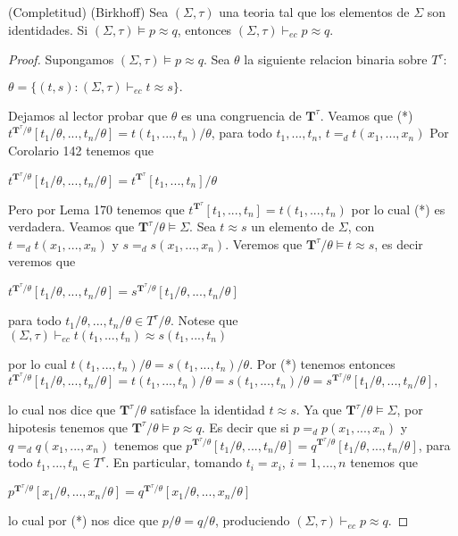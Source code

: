   \begin{theorem}
    (Completitud) (Birkhoff) Sea \((\Sigma ,\tau )\) una teoria tal que los elementos de \(\Sigma \) son identidades. Si \((\Sigma ,\tau )\models p\approx q \), entonces \((\Sigma ,\tau )\vdash _{ec}p\approx q.\)
  \end{theorem}
  \begin{proof}
    Supongamos \((\Sigma ,\tau )\models p\approx q.\) Sea \(\theta \) la siguiente relacion binaria sobre \(T^{\tau }\):

    \(\displaystyle \theta =\{(t,s):(\Sigma ,\tau )\vdash _{ec}t\approx s\}. \)

    Dejamos al lector probar que \(\theta \) es una congruencia de \(\mathbf{T} ^{\tau }\). Veamos que
    (*) \(t^{\mathbf{T}^{\tau }/\theta }[t_{1}/\theta ,...,t_{n}/\theta ]=t(t_{1},...,t_{n})/\theta \), para todo \(t_{1},...,t_{n}\), \( t=_{d}t(x_{1},...,x_{n})\)
    Por Corolario 142 tenemos que

    \(\displaystyle t^{\mathbf{T}^{\tau }/\theta }[t_{1}/\theta ,...,t_{n}/\theta ]=t^{\mathbf{T} ^{\tau }}[t_{1},...,t_{n}]/\theta \)

    Pero por Lema 170 tenemos que \(t^{\mathbf{T}^{\tau }}[t_{1},...,t_{n}]=t(t_{1},...,t_{n})\) por lo cual (*) es verdadera.
    Veamos que \(\mathbf{T}^{\tau }/\theta \models \Sigma .\) Sea \(t\approx s\) un elemento de \(\Sigma \), con \(t=_{d}t(x_{1},...,x_{n})\) y \( s=_{d}s(x_{1},...,x_{n}).\) Veremos que \(\mathbf{T}^{\tau }/\theta \models t\approx s\), es decir veremos que

    \(\displaystyle t^{\mathbf{T}^{\tau }/\theta }[t_{1}/\theta ,...,t_{n}/\theta ]=s^{\mathbf{T} ^{\tau }/\theta }[t_{1}/\theta ,...,t_{n}/\theta ] \)

    para todo \(t_{1}/\theta ,...,t_{n}/\theta \in T^{\tau }/\theta \). Notese que
    \(\displaystyle (\Sigma ,\tau )\vdash _{ec}t(t_{1},...,t_{n})\approx s(t_{1},...,t_{n}) \)

    por lo cual \(t(t_{1},...,t_{n})/\theta =s(t_{1},...,t_{n})/\theta .\) Por (*) tenemos entonces
    \(\displaystyle t^{\mathbf{T}^{\tau }/\theta }[t_{1}/\theta ,...,t_{n}/\theta ]=t(t_{1},...,t_{n})/\theta =s(t_{1},...,t_{n})/\theta =s^{\mathbf{T}^{\tau }/\theta }[t_{1}/\theta ,...,t_{n}/\theta ], \)

    lo cual nos dice que \(\mathbf{T}^{\tau }/\theta \) satisface la identidad \( t\approx s.\)
    Ya que \(\mathbf{T}^{\tau }/\theta \models \Sigma \), por hipotesis tenemos que \(\mathbf{T}^{\tau }/\theta \models p\approx q.\) Es decir que si \( p=_{d}p(x_{1},...,x_{n})\) y \(q=_{d}q(x_{1},...,x_{n})\) tenemos que \(p^{ \mathbf{T}^{\tau }/\theta }[t_{1}/\theta ,...,t_{n}/\theta ]=q^{\mathbf{T} ^{\tau }/\theta }[t_{1}/\theta ,...,t_{n}/\theta ]\), para todo \( t_{1},...,t_{n}\in T^{\tau }\). En particular, tomando \(t_{i}=x_{i}\), \( i=1,...,n\) tenemos que

    \(\displaystyle p^{\mathbf{T}^{\tau }/\theta }[x_{1}/\theta ,...,x_{n}/\theta ]=q^{\mathbf{T} ^{\tau }/\theta }[x_{1}/\theta ,...,x_{n}/\theta ] \)

    lo cual por (*) nos dice que \(p/\theta =q/\theta \), produciendo \((\Sigma ,\tau )\vdash _{ec}p\approx q\).
  \end{proof}
